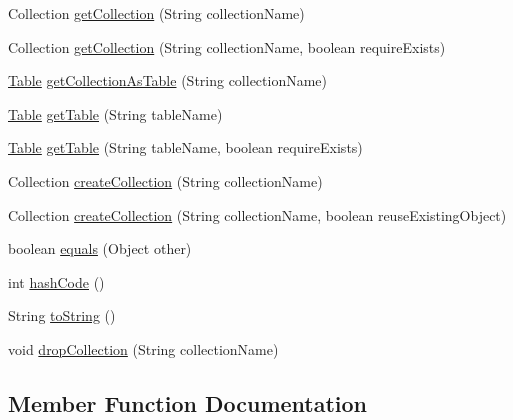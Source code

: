 \begin{DoxyCompactItemize}
\item 
Collection \mbox{\hyperlink{classcom_1_1mysql_1_1cj_1_1xdevapi_1_1_schema_impl_abcdaa1e922b045e78ed4748279042ed9}{get\+Collection}} (String collection\+Name)
\item 
Collection \mbox{\hyperlink{classcom_1_1mysql_1_1cj_1_1xdevapi_1_1_schema_impl_a465ae06f3ba56080cbc7405ff428f01b}{get\+Collection}} (String collection\+Name, boolean require\+Exists)
\item 
\mbox{\hyperlink{interfacecom_1_1mysql_1_1cj_1_1xdevapi_1_1_table}{Table}} \mbox{\hyperlink{classcom_1_1mysql_1_1cj_1_1xdevapi_1_1_schema_impl_a8382999acc577f81226c60bfa015a8a9}{get\+Collection\+As\+Table}} (String collection\+Name)
\item 
\mbox{\hyperlink{interfacecom_1_1mysql_1_1cj_1_1xdevapi_1_1_table}{Table}} \mbox{\hyperlink{classcom_1_1mysql_1_1cj_1_1xdevapi_1_1_schema_impl_a47c591b1796cbcb04985088ad3cbaad7}{get\+Table}} (String table\+Name)
\item 
\mbox{\hyperlink{interfacecom_1_1mysql_1_1cj_1_1xdevapi_1_1_table}{Table}} \mbox{\hyperlink{classcom_1_1mysql_1_1cj_1_1xdevapi_1_1_schema_impl_a6bef049505f3d49b68e56fb2169dc165}{get\+Table}} (String table\+Name, boolean require\+Exists)
\item 
Collection \mbox{\hyperlink{classcom_1_1mysql_1_1cj_1_1xdevapi_1_1_schema_impl_a36cc97bce57ffb6124bc7f25ee6ed60e}{create\+Collection}} (String collection\+Name)
\item 
Collection \mbox{\hyperlink{classcom_1_1mysql_1_1cj_1_1xdevapi_1_1_schema_impl_a723a878ef263bfeec2efcf434849da84}{create\+Collection}} (String collection\+Name, boolean reuse\+Existing\+Object)
\item 
boolean \mbox{\hyperlink{classcom_1_1mysql_1_1cj_1_1xdevapi_1_1_schema_impl_af8aa5d4ff38f013efaa8b38955b6327d}{equals}} (Object other)
\item 
int \mbox{\hyperlink{classcom_1_1mysql_1_1cj_1_1xdevapi_1_1_schema_impl_ac5823bc78000f3e7241045caf9122578}{hash\+Code}} ()
\item 
String \mbox{\hyperlink{classcom_1_1mysql_1_1cj_1_1xdevapi_1_1_schema_impl_a75d95d9f6bc42e795afc262f4acb7664}{to\+String}} ()
\item 
void \mbox{\hyperlink{classcom_1_1mysql_1_1cj_1_1xdevapi_1_1_schema_impl_a8420b65714f543e4bd4a113edeadeb14}{drop\+Collection}} (String collection\+Name)
\end{DoxyCompactItemize}


\subsection{Member Function Documentation}
\mbox{\label{classcom_1_1mysql_1_1cj_1_1xdevapi_1_1_schema_impl_a36cc97bce57ffb6124bc7f25ee6ed60e}} 
